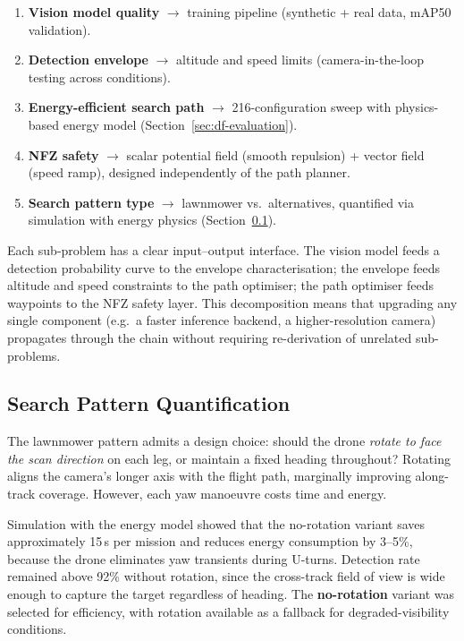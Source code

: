 \begin{enumerate}[nosep]
  \item \textbf{Vision model quality} $\to$ training pipeline (synthetic + real data, mAP50 validation).
  \item \textbf{Detection envelope} $\to$ altitude and speed limits (camera-in-the-loop testing across conditions).
  \item \textbf{Energy-efficient search path} $\to$ 216-configuration sweep with physics-based energy model (Section~\ref{sec:df-evaluation}).
  \item \textbf{NFZ safety} $\to$ scalar potential field (smooth repulsion) + vector field (speed ramp), designed independently of the path planner.
  \item \textbf{Search pattern type} $\to$ lawnmower vs.\ alternatives, quantified via simulation with energy physics (Section~\ref{sec:df-pattern-type}).
\end{enumerate}

Each sub-problem has a clear input--output interface. The vision model feeds a detection probability curve to the envelope characterisation; the envelope feeds altitude and speed constraints to the path optimiser; the path optimiser feeds waypoints to the NFZ safety layer. This decomposition means that upgrading any single component (e.g.\ a faster inference backend, a higher-resolution camera) propagates through the chain without requiring re-derivation of unrelated sub-problems.

\subsection{Search Pattern Quantification}\label{sec:df-pattern-type}

The lawnmower pattern admits a design choice: should the drone \emph{rotate to face the scan direction} on each leg, or maintain a fixed heading throughout? Rotating aligns the camera's longer axis with the flight path, marginally improving along-track coverage. However, each yaw manoeuvre costs time and energy.

Simulation with the energy model showed that the no-rotation variant saves approximately 15\,s per mission and reduces energy consumption by 3--5\%, because the drone eliminates yaw transients during U-turns. Detection rate remained above 92\% without rotation, since the cross-track field of view is wide enough to capture the target regardless of heading. The \textbf{no-rotation} variant was selected for efficiency, with rotation available as a fallback for degraded-visibility conditions.


